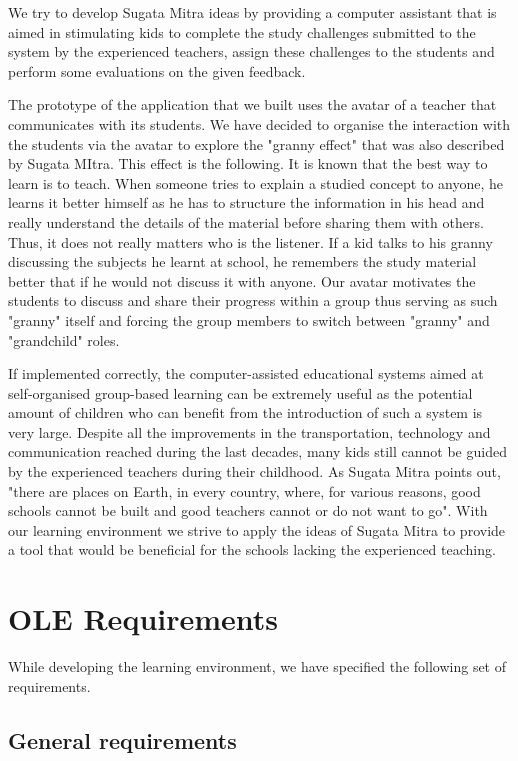 \documentclass[a4paper]{article}
\begin{document}
We try to develop Sugata Mitra ideas by providing a computer assistant that is aimed in stimulating kids to complete the study challenges submitted to the system by the experienced teachers, assign these challenges to the students and perform some evaluations on the given feedback.

The prototype of the application that we built uses the avatar of a teacher that communicates with its students. We have decided to organise the interaction with the students via the avatar to explore the "granny effect" that was also described by Sugata MItra. This effect is the following. It is known that the best way to learn is to teach. When someone tries to explain a studied concept to anyone, he learns it better himself as he has to structure the information in his head and really understand the details of the material before sharing them with others. Thus, it does not really matters who is the listener. If a kid talks to his granny discussing the subjects he learnt at school, he remembers the study material better that if he would not discuss it with anyone. Our avatar motivates the students to discuss and share their progress within a group thus serving as such "granny" itself and forcing the group members to switch between "granny" and "grandchild" roles.

If implemented correctly, the computer-assisted educational systems aimed at self-organised group-based learning can be extremely useful as the potential amount of children who can benefit from the introduction of such a system is very large. Despite all the improvements in the transportation, technology and communication reached during the last decades, many kids still cannot be guided by the experienced teachers during their childhood. As Sugata Mitra points out, "there are places on Earth, in every country, where, for various reasons, good schools cannot be built and good teachers cannot or do not want to go". With our learning environment we strive to apply the ideas of Sugata Mitra to provide a tool that would be beneficial for the schools lacking the experienced teaching.


\section{OLE Requirements}

While developing the learning environment, we have specified the following set of requirements.

\subsection{General requirements}
\end{document}

